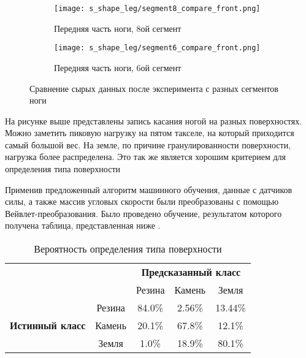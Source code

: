 \begin{figure}[ht!]
    \begin{subfigure}[t]{0.99\textwidth}
        \centering\texttt{[image: s\_shape\_leg/segment8\_compare\_front.png]}
        \caption{Передняя часть ноги, 8ой сегмент}
    \end{subfigure}

    \begin{subfigure}[t]{0.99\textwidth}
        \centering\texttt{[image: s\_shape\_leg/segment6\_compare\_front.png]}
        \caption{Передняя часть ноги, 6ой сегмент}
    \end{subfigure}
    \caption{Сравнение сырых данных после эксперимента с разных сегментов ноги}
    \label{fig:data_from_legs}
\end{figure}





На рисунке выше  представлены запись касания ногой на разных поверхностях. Можно заметить пиковую нагрузку на пятом такселе, на который приходится самый большой вес. На земле, по причине гранулированности поверхности, нагрузка более распределена. Это так же является хорошим критерием для определения типа поверхности

Применив предложенный алгоритм машинного обучения, данные с датчиков силы, а также массив угловых скорости были преобразованы с помощью Вейвлет-преобразования. Было проведено обучение, результатом которого получена таблица, представленная ниже .

\begin{table}[H]
    \caption{Вероятность определения типа поверхности}
    \label{tabular:prob_terrain_classification}
    \centering
\begin{tabular}{|c|c|c|c|c|} 
    \cline{3-5}
    \multicolumn{1}{l}{} & \multicolumn{1}{l|}{} & \multicolumn{3}{c|}{\textbf{Предсказанный класс}} \\ 
    \cline{3-5}
    \multicolumn{1}{l}{} &  & Резина & Камень & Земля \\ 
    \hline
    \multirow{3}{*}{{\textbf{Истинный класс}}} & Резина & {\cellcolor[rgb]{0.741,0.843,0.929}}84.0\% & 2.56\% & 13.44\% \\ 
    \hhline{|~----|}
     & Камень & 20.1\% & {\cellcolor[rgb]{0.741,0.843,0.929}}67.8\% & 12.1\% \\ 
    \hhline{|~----|}
     & Земля & 1.0\% & 18.9\% & {\cellcolor[rgb]{0.741,0.843,0.929}}80.1\% \\
    \hline
    \end{tabular}
\end{table}


